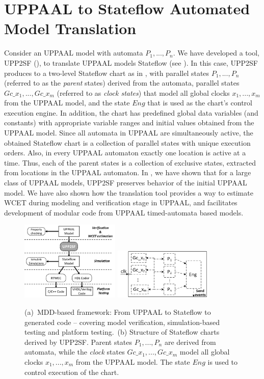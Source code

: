 \section{UPPAAL to Stateflow Automated Model Translation}
Consider an UPPAAL model with automata $P_1,...,P_n$. We have developed a tool, UPP2SF (\cite{TECS}), to translate UPPAAL models Stateflow (see ). In this case, UPP2SF produces to a two-level Stateflow chart as in , with parallel states $P_1,...,P_n$ (referred to as the \textit{parent} states) derived from the automata, parallel states $Gc\_{x_1},..., Gc\_{x_m}$ (referred to as \textit{clock states}) that model all global clocks $x_1,...,x_m$ from the UPPAAL model, and the state $Eng$ that is used as the chart's control execution engine.
In addition, the chart has predefined global data variables (and constants) with appropriate variable ranges and initial values obtained from the UPPAAL model. 
Since all automata in UPPAAL are simultaneously active, the obtained Stateflow chart is a collection of parallel states with unique execution orders. Also, in every UPPAAL automaton exactly one location is active at a time. Thus, each of the parent states is a collection of exclusive states, extracted from locations in the UPPAAL automaton. In \cite{TECS}, we have shown that for a large class of UPPAAL models, UPP2SF preserves behavior of the initial UPPAAL model. We have also shown how the translation tool provides a way to estimate WCET during modeling and verification stage in UPPAAL, and facilitates development of modular code from UPPAAL timed-automata based models. 
\begin{figure}[!t]
\centering
		\subfigure 
		{			
		\includegraphics[width=0.42\textwidth]{figs/method_new1.png}		
		\label{fig:method}
		}
		\hspace{.2in} 
		\subfigure 
		{	
			\includegraphics[width=0.42\textwidth]{figs/chart_GlobalClocks_rev1.png}
			\label{fig:chart}
		}
\caption{(a)~MDD-based framework: From UPPAAL to Stateflow to generated code -- covering model verification, simulation-based testing and platform testing.~(b) Structure of Stateflow charts derived by UPP2SF. Parent states $P_1,...,P_n$ are derived from automata, while the \textit{clock} states $Gc\_{x_1},..., Gc\_{x_m}$ model all global clocks $x_1,...,x_m$ from the UPPAAL model. The state $Eng$ is used to control execution of the chart.}
\label{fig:upp2sftool}
\end{figure} 
